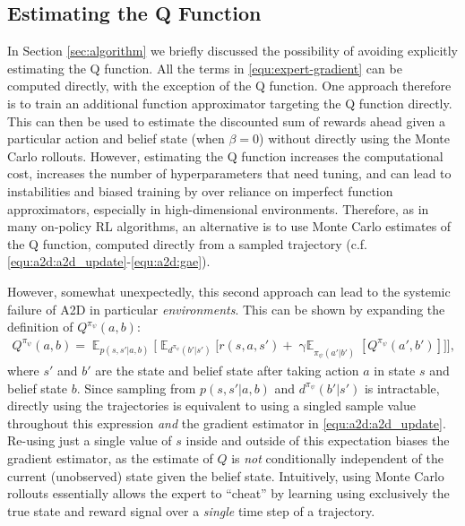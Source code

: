 \label{supp:exp}

\subsection{Estimating the Q Function}
\label{supp:sub:sub:q}
In Section \ref{sec:algorithm} we briefly discussed the possibility of avoiding explicitly estimating the Q function.  All the terms in \eqref{equ:expert-gradient} can be computed directly, with the exception of the Q function.  One approach therefore is to train an additional function approximator targeting the Q function directly.  This can then be used to estimate the discounted sum of rewards ahead given a particular action and belief state (when $\beta = 0$) without directly using the Monte Carlo rollouts.  However, estimating the Q function increases the computational cost, increases the number of hyperparameters that need tuning, and can lead to instabilities and biased training by over reliance on imperfect function approximators, especially in high-dimensional environments.  Therefore, as in many on-policy RL algorithms, an alternative is to use Monte Carlo estimates of the Q function, computed directly from a sampled trajectory (c.f. \eqref{equ:a2d:a2d_update}-\eqref{equ:a2d:gae}).  

However, somewhat unexpectedly, this second approach can lead to the systemic failure of A2D in particular \emph{environments}.  This can be shown by expanding the definition of $Q^{{\pi_{\psi}}}(a,b)$:
\begin{align}
     Q^{{\pi_{\psi}}}(a,b) = \mathop{\mathbb{E}}_{p(s, s'|a,b)} \Bigg[ \mathop{\mathbb{E}}_{d^{{\pi_{\psi}}}(b'|s')} \Big[ r(s,a,s') + \mathop{\gamma\mathbb{E}}_{\pi_{\psi}(a'|b')} \left[ Q^{\pi_{\psi}} (a', b') \right] \Big] \Bigg], \label{supp:equ:q_loss}
\end{align}
where $s'$ and $b'$ are the state and belief state after taking action $a$ in state $s$ and belief state $b$.  Since sampling from $p(s, s'|a,b)$ and $d^{{\pi_{\psi}}}(b' | s')$ is intractable, directly using the trajectories is equivalent to using a singled sample value throughout this expression \emph{and} the gradient estimator in \eqref{equ:a2d:a2d_update}.  Re-using just a single value of $s$ inside and outside of this expectation biases the gradient estimator, as the estimate of $Q$ is \emph{not} conditionally independent of the current (unobserved) state given the belief state.  Intuitively, using Monte Carlo rollouts  essentially allows the expert to ``cheat'' by learning using exclusively the true state and reward signal over a \emph{single} time step of a trajectory.  


